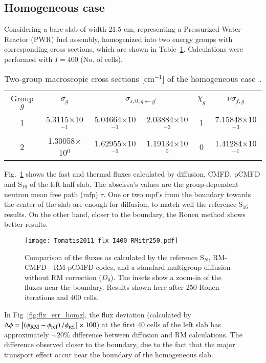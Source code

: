 \subsection{Homogeneous case}
\label{sec:homog}
Considering a bare slab of width 21.5 cm, representing a Pressurized Water Reactor (PWR) fuel assembly, homogenized into two energy groups with corresponding cross sections, which are shown in Table~\ref{tab:xs_hom}. Calculations were performed with $I=400$ (No. of cells).

\begin{table}[!htbp]
	\centering
	\caption{Two-group macroscopic cross sections [cm$^{-1}$] of the homogeneous case~\cite{Tomatis-2011}.}
	\label{tab:xs_hom}
	\begin{tabular}{cccccc}
		Group $g$ &  $\sigma_{g}$ & \multicolumn{2}{c}{$\sigma_{s,0,g\leftarrow g'}$} & $\chi_g$ & $\nu\sigma_{f,g}$ \\[3mm]
		1 & 5.3115$\times$10$^{-1}$ & 5.04664$\times$10$^{-1}$ & 2.03884$\times$10$^{-3}$ & 1 & 7.15848$\times$10$^{-3}$ \\
		2 & 1.30058$\times$10$^{0}$& 1.62955$\times$10$^{-2}$ & 1.19134$\times$10$^{0}$	& 0 & 1.41284$\times$10$^{-1}$ \\
	\end{tabular}
\end{table}

Fig.~\ref{fig:slab-fluxes} shows the fast and thermal fluxes calculated by diffusion, CMFD, pCMFD and S$_{16}$ of the left half slab. The abscissa's values are the group-dependent neutron mean free path (mfp) $\tau$. One or two mpf's from the boundary towards the center of the slab are enough for diffusion, to match well the reference S$_16$ results. On the other hand, closer to the boundary, the Ronen method shows better results. 

\begin{figure}[!htbp]
	\centering
	\texttt{[image: Tomatis2011\_flx\_I400\_RMitr250.pdf]}
	\caption{Comparison of the fluxes as calculated by the reference S$_N$, RM-CMFD - RM-pCMFD codes, and a standard multigroup diffusion without RM correction ($D_0$). The insets show a zoom-in of the fluxes near the boundary. Results shown here after 250 Ronen iterations and 400 cells.}
	\label{fig:slab-fluxes}		
\end{figure}

In Fig~\ref{fig:flx_err_homg}, the flux deviation (calculated by $\Delta \phi = \left[\left(\phirm-\phiref\right)/\phiref\right]\times 100$) at the first 40 cells of the left slab has approximately $\sim 20\%$ difference between diffusion and RM calculations. The difference observed closer to the boundary, due to the fact that the major transport effect occur near the boundary of the homogeneous slab. 

